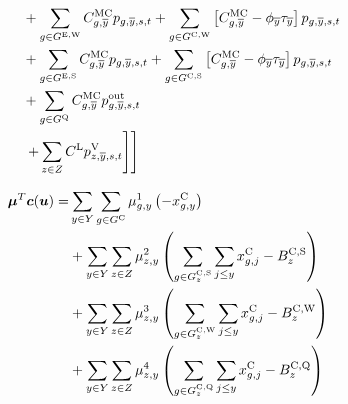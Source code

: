 \documentclass{article}
\begin{document}
\begin{alignat}{3}
	& && && + \sum\limits_{\iGenerator \in \sGeneratorsExistingWind} \cMarginalCost[\iGenerator,\iYearTerminal] \vPower[\iGenerator,\iYearTerminal,\iScenario,\iInterval] + \sum\limits_{\iGenerator \in \sGeneratorsCandidateWind} \left[\cMarginalCost[\iGenerator,\iYearTerminal] - \vBaseline[\iYearTerminal] \vPermitPrice[\iYearTerminal]\right] \vPower[\iGenerator,\iYearTerminal,\iScenario,\iInterval] \nonumber\\
	& && && + \sum\limits_{\iGenerator \in \sGeneratorsExistingSolar} \cMarginalCost[\iGenerator,\iYearTerminal] \vPower[\iGenerator,\iYearTerminal,\iScenario,\iInterval] + \sum\limits_{\iGenerator \in \sGeneratorsCandidateSolar} \left[\cMarginalCost[\iGenerator,\iYearTerminal] - \vBaseline[\iYearTerminal]\vPermitPrice[\iYearTerminal]\right] \vPower[\iGenerator,\iYearTerminal,\iScenario,\iInterval]\nonumber\\
	& && && + \sum\limits_{\iGenerator \in \sStorage} \cMarginalCost[\iGenerator,\iYearTerminal] \vPowerOut[\iGenerator,\iYearTerminal,\iScenario,\iInterval] \nonumber\\
	& && && \left.\left. + \sum\limits_{\iZone \in \sZones} \cLostLoadCost \vLostLoadPower[\iZone,\iYearTerminal,\iScenario,\iInterval] \right]\right] \nonumber\\
\end{alignat}

\begin{align}
\begin{split}
\bm{\mu}^{T}\bm{c}(\bm{u}) = & \sum\limits_{\iYear \in \sYears} \sum\limits_{\iGenerator \in \sGeneratorsCandidate} \dNonNegativeCandidateCapacity \left(-\vInstalledCapacity\right)\\
& + \sum\limits_{\iYear \in \sYears}\sum\limits_{\iZone \in \sZones} \dSolarBuildLimit \left(\sum\limits_{\iGenerator \in \sGeneratorsCandidateSolar_{\iZone}} \sum\limits_{\iYearAlias \leq \iYear} \vInstalledCapacity[\iGenerator,\iYearAlias]  - \cBuildLimitSolar\right)\\
& + \sum\limits_{\iYear \in \sYears}\sum\limits_{\iZone \in \sZones} \dWindBuildLimit \left(\sum\limits_{\iGenerator \in \sGeneratorsCandidateWind_{\iZone}} \sum\limits_{\iYearAlias \leq \iYear} \vInstalledCapacity[\iGenerator,\iYearAlias] - \cBuildLimitWind\right)\\
& + \sum\limits_{\iYear \in \sYears}\sum\limits_{\iZone \in \sZones} \dStorageBuildLimit \left(\sum\limits_{\iGenerator \in \sStorageCandidate_{\iZone}} \sum\limits_{\iYearAlias \leq \iYear} \vInstalledCapacity[\iGenerator,\iYearAlias] - \cBuildLimitStorage\right)\\
\end{split}
\end{align}
\end{document}
